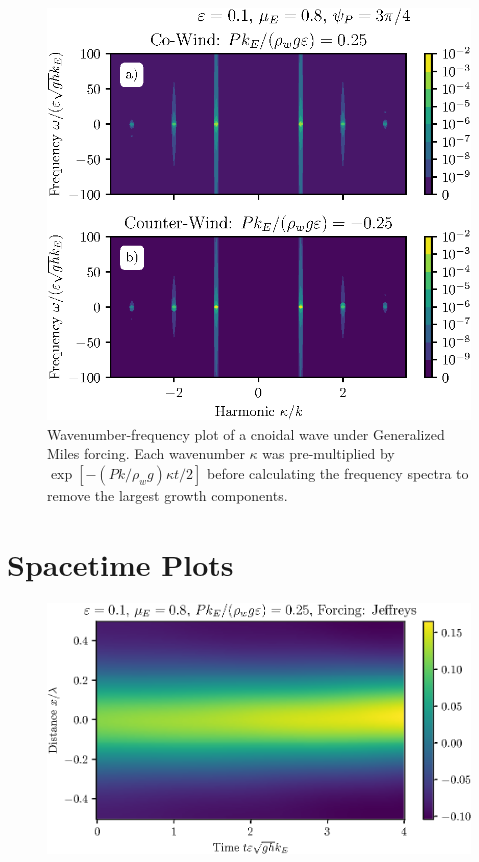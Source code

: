 \documentclass{jfm}
\let\Oldsection\section
\renewcommand{\section}{\FloatBarrier\Oldsection}
\begin{document}
\begin{figure}
  \centering
  \includegraphics{Double-Power-Spectrum-GM.eps}
  \caption{
    Wavenumber-frequency plot of a cnoidal wave under Generalized Miles
    forcing.
    Each wavenumber $\kappa$ was pre-multiplied by $\exp[-(P k/\rho_w
    g) \kappa t/2]$ before calculating the frequency spectra to remove
    the largest growth components.
  }
\end{figure}

\section{Spacetime Plots}
\begin{figure}
  \centering
  \includegraphics{Spacetime-Mesh.eps}
  \caption{}
\end{figure}
\end{document}
